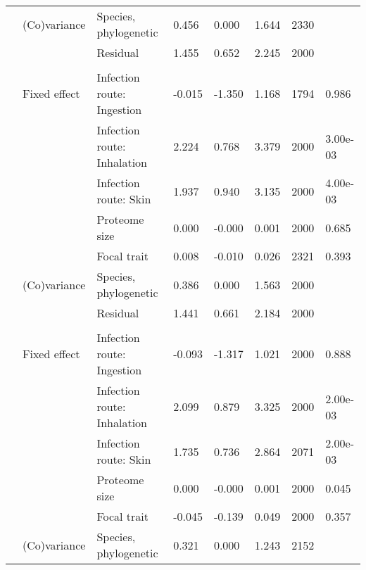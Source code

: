\begin{table}
\begin{tabular}[t]{llllllll}
\hspace{1em} & (Co)variance & Species, phylogenetic & 0.456 & 0.000 & 1.644 & 2330 & \\
\hspace{1em} &  & Residual & 1.455 & 0.652 & 2.245 & 2000 & \\
\addlinespace[0.3em]
\multicolumn{8}{l}{\textbf{Siderophores}}\\
\hspace{1em} & Fixed effect & Infection route: Ingestion & -0.015 & -1.350 & 1.168 & 1794 & 0.986\\
\hspace{1em} &  & Infection route: Inhalation & 2.224 & 0.768 & 3.379 & 2000 & 3.00e-03\\
\hspace{1em} &  & Infection route: Skin & 1.937 & 0.940 & 3.135 & 2000 & 4.00e-03\\
\hspace{1em} &  & Proteome size & 0.000 & -0.000 & 0.001 & 2000 & 0.685\\
\hspace{1em} &  & Focal trait & 0.008 & -0.010 & 0.026 & 2321 & 0.393\\
\hspace{1em} & (Co)variance & Species, phylogenetic & 0.386 & 0.000 & 1.563 & 2000 & \\
\hspace{1em} &  & Residual & 1.441 & 0.661 & 2.184 & 2000 & \\
\addlinespace[0.3em]
\multicolumn{8}{l}{\textbf{Antibiotic degradation}}\\
\hspace{1em} & Fixed effect & Infection route: Ingestion & -0.093 & -1.317 & 1.021 & 2000 & 0.888\\
\hspace{1em} &  & Infection route: Inhalation & 2.099 & 0.879 & 3.325 & 2000 & 2.00e-03\\
\hspace{1em} &  & Infection route: Skin & 1.735 & 0.736 & 2.864 & 2071 & 2.00e-03\\
\hspace{1em} &  & Proteome size & 0.000 & -0.000 & 0.001 & 2000 & 0.045\\
\hspace{1em} &  & Focal trait & -0.045 & -0.139 & 0.049 & 2000 & 0.357\\
\hspace{1em} & (Co)variance & Species, phylogenetic & 0.321 & 0.000 & 1.243 & 2152 & \\

\end{tabular}
\end{table}
